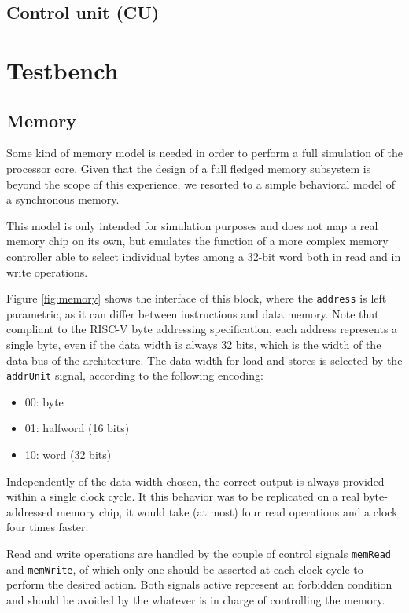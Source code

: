 \documentclass[a4paper]{article}
\begin{document}
\subsection{Control unit (CU)}


\section{Testbench}
\subsection{Memory}
Some kind of memory model is needed in order to perform a full simulation of the processor core. Given that the design of a full fledged memory subsystem is beyond the scope of this experience, we resorted to a simple behavioral model of a synchronous memory.

This model is only intended for simulation purposes and does not map a real memory chip on its own, but emulates the function of a more complex memory controller able to select individual bytes among a 32-bit word both in read and in write operations.

Figure \ref{fig:memory} shows the interface of this block, where the \texttt{address} is left parametric, as it can differ between instructions and data memory. Note that compliant to the RISC-V byte addressing specification, each address represents a single byte, even if the data width is always 32 bits, which is the width of the data bus of the architecture. The data width for load and stores is selected by the \texttt{addrUnit} signal, according to the following encoding:
\begin{itemize}
    \item 00: byte
    \item 01: halfword (16 bits)
    \item 10: word (32 bits)
\end{itemize}
Independently of the data width chosen, the correct output is always provided within a single clock cycle. It this behavior was to be replicated on a real byte-addressed memory chip, it would take (at most) four read operations and a clock four times faster.

Read and write operations are handled by the couple of control signals \texttt{memRead} and \texttt{memWrite}, of which only one should be asserted at each clock cycle to perform the desired action. Both signals active represent an forbidden condition and should be avoided by the whatever is in charge of controlling the memory.
\end{document}

